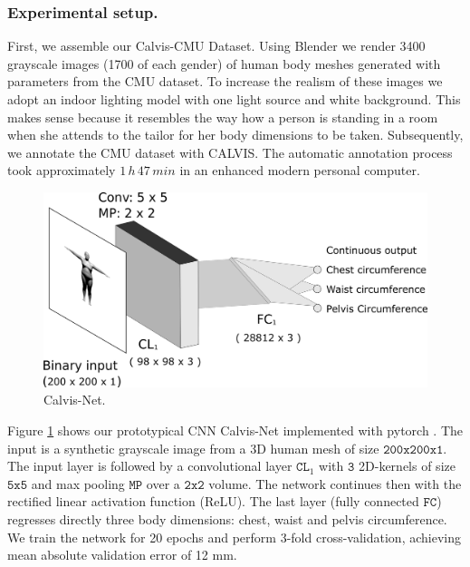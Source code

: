 \documentclass[runningheads, orivec]{llncs}
\begin{document}
\subsubsection{Experimental setup.} First, we assemble our Calvis-CMU Dataset. 
Using Blender we render 3400 grayscale images (1700 of each gender) of 
human body meshes generated with parameters from the CMU dataset. To increase 
the realism of these images we 
adopt an indoor lighting model with one light source and white background. This makes sense because it resembles the way 
how a person is standing in a room when she attends to the tailor for her 
body dimensions to be taken.
Subsequently, we annotate the CMU dataset with CALVIS. The 
automatic annotation process took approximately $1\,h\, 47\, min$ in an 
enhanced modern personal computer.

\begin{figure}[H]
	\begin{center}
		\includegraphics[width=\linewidth]{Calvis-Net.png}
	\end{center}
	\caption{Calvis-Net.}
	\label{fig:calvis_net}
\end{figure}

Figure \ref{fig:calvis_net} shows our prototypical CNN Calvis-Net implemented 
with pytorch \cite{paszke2017automatic}. The 
input is a synthetic grayscale image from a 3D human mesh of size $\mathtt{200 
x 200 x 
1}$. The input layer is followed by a convolutional layer $\mathtt{CL}_1$ with 
$\mathtt{3}$ 2D-kernels of 
size $\mathtt{5 x 5}$ and max pooling $\mathtt{MP}$ over a $\mathtt{2 x 2}$ 
volume. The network continues then with the rectified linear activation function
(ReLU). The last layer (fully connected $\mathtt{FC}$) regresses directly three 
body 
dimensions: chest, waist and pelvis circumference. We train the network for 20 
epochs and perform 3-fold 
cross-validation, achieving mean absolute validation error of 12 
mm.
\end{document}

